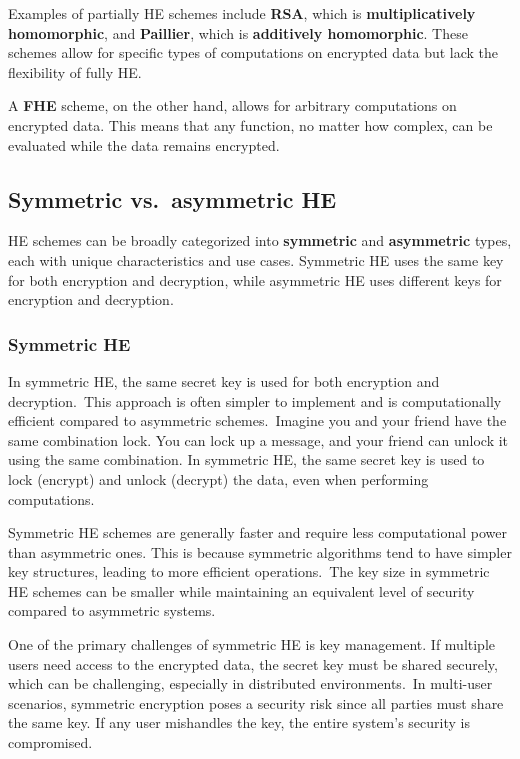 \documentclass[
  letterpaper,
  DIV=11,
  numbers=noendperiod,
  oneside]{scrartcl}
\begin{document}
Examples of partially HE schemes include \textbf{RSA}, which is
\textbf{multiplicatively homomorphic}, and \textbf{Paillier}, which is
\textbf{additively homomorphic}. These schemes allow for specific types
of computations on encrypted data but lack the flexibility of fully HE.

A \textbf{FHE} scheme, on the other hand, allows for arbitrary
computations on encrypted data. This means that any function, no matter
how complex, can be evaluated while the data remains encrypted.

\subsection{Symmetric vs.~asymmetric
HE}\label{symmetric-vs.-asymmetric-he}

HE schemes can be broadly categorized into \textbf{symmetric} and
\textbf{asymmetric} types, each with unique characteristics and use
cases. Symmetric HE uses the same key for both encryption and
decryption, while asymmetric HE uses different keys for encryption and
decryption.

\subsubsection{Symmetric HE}\label{symmetric-he}

In symmetric HE, the same secret key is used for both encryption and
decryption.~This approach is often simpler to implement and is
computationally efficient compared to asymmetric schemes.~Imagine you
and your friend have the same combination lock. You can lock up a
message, and your friend can unlock it using the same combination. In
symmetric HE, the same secret key is used to lock (encrypt) and unlock
(decrypt) the data, even when performing computations.

Symmetric HE schemes are generally faster and require less computational
power than asymmetric ones. This is because symmetric algorithms tend to
have simpler key structures, leading to more efficient operations.~The
key size in symmetric HE schemes can be smaller while maintaining an
equivalent level of security compared to asymmetric systems.

One of the primary challenges of symmetric HE is key management. If
multiple users need access to the encrypted data, the secret key must be
shared securely, which can be challenging, especially in distributed
environments.~In multi-user scenarios, symmetric encryption poses a
security risk since all parties must share the same key. If any user
mishandles the key, the entire system's security is compromised.
\end{document}
